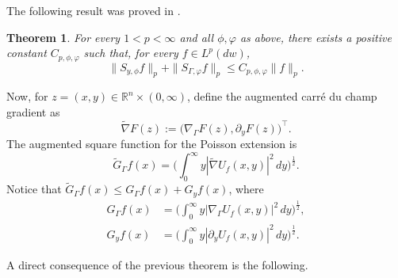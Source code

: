 \documentclass[11pt]{amsart}
\newtheorem{theorem}{Theorem}[section]
\newtheorem{corollary}[theorem]{Corollary}
\theoremstyle{definition}
\theoremstyle{remark}
\numberwithin{equation}{section}
\newcommand{\R}{\mathbb{R}}
\begin{document}
The following result was proved in \cite{DzHe}.
\begin{theorem}\label{T: Dzhe}
For every $1<p<\infty$ and all $\phi,\varphi$ as above, there exists a positive constant $C_{p,\phi,\varphi}$ such that, for every $f\in L^p(dw)$,
\[
\|S_{y,\phi}f\|_p+\|S_{\Gamma,\varphi}f\|_p
\leq C_{p,\phi,\varphi}\|f\|_p.
\]
\end{theorem}

Now, for $z=(x,y)\in\R^n\times(0,\infty)$, define the augmented carr\'e du champ gradient as
\begin{equation*}
\widetilde\nabla F(z)
:=
\bigl(\nabla_\Gamma F(z),\partial_yF(z)\bigr)^\top.
\end{equation*}
The augmented square function for the Poisson extension is
\[
\widetilde G_\Gamma f(x)
=\bigg(\int_0^\infty y|\widetilde\nabla U_f(x,y)|^2\,dy\bigg)^{\frac12}.
\]
Notice that $\widetilde G_\Gamma f(x)\leq G_\Gamma f(x)+G_yf(x)$, where
\begin{align*}
G_\Gamma f(x)&=\bigg(\int_0^\infty y|\nabla_\Gamma U_f(x,y)|^2\,dy\bigg)^{\frac12},\\
G_yf(x)&=\bigg(\int_0^\infty y|\partial_yU_f(x,y)|^2\,dy\bigg)^{\frac12}.
\end{align*}

A direct consequence of the previous theorem is the following.
\end{document}
